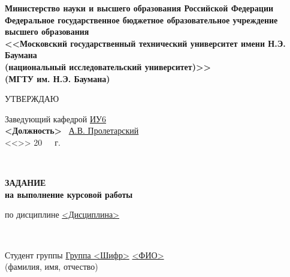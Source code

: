 \documentclass[utf8x, 11pt, oneside, a4paper]{article}
\begin{document}
	\thispagestyle{empty}
	\begin{center}
		\fontsize{11pt}{0.3\baselineskip}\selectfont \textbf{Министерство науки и высшего образования Российской Федерации 
		\\ Федеральное государственное бюджетное образовательное учреждение 
		\\ высшего образования 
		\\ <<Московский государственный технический университет имени Н.Э. Баумана
		\\ (национальный исследовательский университет)>>
		\\ (МГТУ им. Н.Э. Баумана)}
		
		\fontsize{12pt}{0.5\baselineskip}\selectfont
		\noindent \makebox[\linewidth]{\rule{\textwidth}{4pt}} \makebox[\linewidth]{\rule{\textwidth}{1pt}}
	\end{center}	
	
	\begin{flushright}
		\fontsize{12pt}{\baselineskip}\selectfont
		УТВЕРЖДАЮ \hspace*{1.4cm}

		\fontsize{12pt}{\baselineskip}\selectfont
		Заведующий кафедрой \uline{\hspace*{0.5cm}}\uline{ИУ6}\uline{\hspace*{0.5cm}} 
		\\ \hfill \textbf{<Должность>} \uline{\hspace*{2.5cm}} \ \uline{А.В. Пролетарский} 
		\\ <<\uline{\hspace*{1cm}}>> \uline{\hspace*{2.5cm}} 20\ \ \   г.
	\end{flushright}
	\
	\begin{center}
		\fontsize{18pt}{\baselineskip}\selectfont \textbf{ЗАДАНИЕ}
		\\ \fontsize{16pt}{\baselineskip}\selectfont \textbf{на выполнение курсовой работы}
	\end{center}

	\normalsize

	\begin{flushleft}
		по дисциплине  \uline{\hspace*{0.5cm}}\uline{<Дисциплина>}\uline{\hspace*{0.5cm}}
		
		\

		Студент группы  \uline{\hspace*{0.5cm}}\uline{Группа <Шифр>}\uline{\hspace*{0.5cm}}
		\center \uline{\hfill <ФИО> \hfill} 
		\\ \fontsize{10pt}{\baselineskip}\selectfont(фамилия, имя, отчество)
	\end{flushleft}
\end{document}
